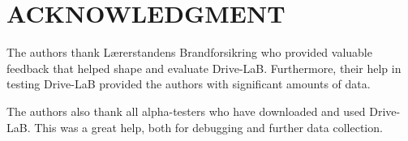 \section*{ACKNOWLEDGMENT}

The authors thank Lærerstandens Brandforsikring who provided valuable feedback that helped shape and evaluate Drive-LaB. Furthermore, their help in testing Drive-LaB provided the authors with significant amounts of data.

The authors also thank all alpha-testers who have downloaded and used Drive-LaB. This was a great help, both for debugging and further data collection.